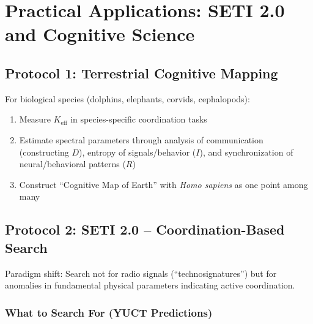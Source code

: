 \documentclass[12pt,a4paper]{article}
\newcommand{\Ke}{K_{\mathrm{eff}}}
\begin{document}
	\section{Practical Applications: SETI 2.0 and Cognitive Science}
	
	\subsection{Protocol 1: Terrestrial Cognitive Mapping}
	
	For biological species (dolphins, elephants, corvids, cephalopods):
	\begin{enumerate}
		\item Measure \(\Ke\) in species-specific coordination tasks
		\item Estimate spectral parameters through analysis of communication (constructing \(D\)), entropy of signals/behavior (\(I\)), and synchronization of neural/behavioral patterns (\(R\))
		\item Construct ``Cognitive Map of Earth'' with \textit{Homo sapiens} as one point among many
	\end{enumerate}
	
	\subsection{Protocol 2: SETI 2.0 -- Coordination-Based Search}
	
	Paradigm shift: Search not for radio signals (``technosignatures'') but for anomalies in fundamental physical parameters indicating active coordination.
	
	\subsubsection{What to Search For (YUCT Predictions)}
	
\end{document}
